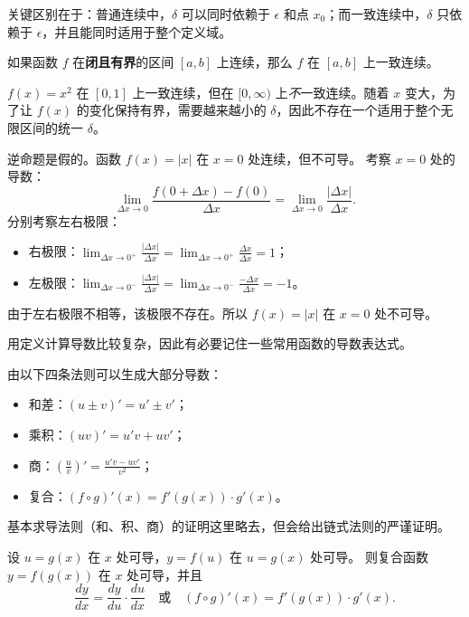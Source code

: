 关键区别在于：普通连续中，$\delta$ 可以同时依赖于 $\epsilon$ 和点 $x_0$；而一致连续中，$\delta$ 只依赖于 $\epsilon$，并且能同时适用于整个定义域。

\begin{theorem}
如果函数 $f$ 在\textbf{闭且有界}的区间 $[a,b]$ 上连续，那么 $f$ 在 $[a,b]$ 上一致连续。
\end{theorem}

\begin{example}
$f(x)=x^2$ 在 $[0,1]$ 上一致连续，但在 $[0,\infty)$ 上\emph{不}一致连续。随着 $x$ 变大，为了让 $f(x)$ 的变化保持有界，需要越来越小的 $\delta$，因此不存在一个适用于整个无限区间的统一 $\delta$。
\end{example}

\begin{example}[连续但不可导]
逆命题是假的。函数 $f(x)=|x|$ 在 $x=0$ 处连续，但不可导。
考察 $x=0$ 处的导数：
\[
\lim_{\Delta x\to 0}\frac{f(0+\Delta x)-f(0)}{\Delta x}=\lim_{\Delta x\to 0}\frac{|\Delta x|}{\Delta x}.
\]
分别考察左右极限：
\begin{itemize}
    \item 右极限：$\lim_{\Delta x\to 0^+}\frac{|\Delta x|}{\Delta x}=\lim_{\Delta x\to 0^+}\frac{\Delta x}{\Delta x}=1$；
    \item 左极限：$\lim_{\Delta x\to 0^-}\frac{|\Delta x|}{\Delta x}=\lim_{\Delta x\to 0^-}\frac{-\Delta x}{\Delta x}=-1$。
\end{itemize}
由于左右极限不相等，该极限不存在。所以 $f(x)=|x|$ 在 $x=0$ 处不可导。
\end{example}

用定义计算导数比较复杂，因此有必要记住一些常用函数的导数表达式。

由以下四条法则可以生成大部分导数：
\begin{itemize}
    \item 和差：$(u\pm v)'=u'\pm v'$；
    \item 乘积：$(uv)'=u'v+uv'$；
    \item 商：$\left(\frac{u}{v}\right)'=\frac{u'v-uv'}{v^2}$；
    \item 复合：$(f\circ g)'(x)=f'(g(x))\cdot g'(x)$。
\end{itemize}

基本求导法则（和、积、商）的证明这里略去，但会给出链式法则的严谨证明。

\begin{theorem}[链式法则]
设 $u=g(x)$ 在 $x$ 处可导，$y=f(u)$ 在 $u=g(x)$ 处可导。
则复合函数 $y=f(g(x))$ 在 $x$ 处可导，并且
\[
\frac{dy}{dx}=\frac{dy}{du}\cdot \frac{du}{dx}\quad \text{或}\quad (f\circ g)'(x)=f'(g(x))\cdot g'(x).
\]
\end{theorem}

